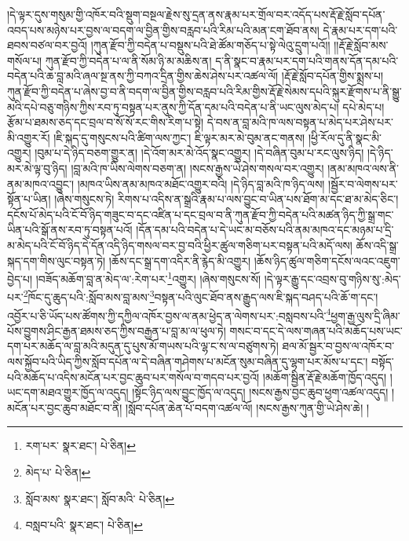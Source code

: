།དེ་ལྟར་དུས་གསུམ་གྱི་འཁོར་བའི་སྡུག་བསྔལ་རྗེས་སུ་དྲན་ནས་རྣམ་པར་གྲོལ་བར་འདོད་པས་རྡོ་རྗེ་སློབ་དཔོན་འབད་པས་མཉེས་པར་བྱས་ལ་བདག་ལ་བྱིན་གྱིས་བརླབ་པའི་རིམ་པའི་མན་ངག་ཐོབ་ནས། དེ་རྣམ་པར་དག་པའི་ཐབས་བཙལ་བར་བྱའོ། །ཀུན་རྫོབ་ཀྱི་བདེན་པ་བསྡུས་པའི་ཐེ་ཚོམ་གཅོད་པ་སྟེ་ལེའུ་དྲུག་པའོ།། །།རྡོ་རྗེ་སློབ་མས་གསོལ་པ། ཀུན་རྫོབ་ཀྱི་བདེན་པ་ལ་ནི་སོམ་ཉི་མ་མཆིས་ན། ད་ནི་སྣང་བ་རྣམ་པར་དག་པའི་གནས་དོན་དམ་པའི་བདེན་པའི་ཆ་བླ་མའི་ཞལ་སྔ་ནས་ཀྱི་བཀའ་དྲིན་གྱིས་ཆེས་ཤེས་པར་འཚལ་ལོ། །རྡོ་རྗེ་སློབ་དཔོན་གྱིས་སྨྲས་པ། ཀུན་རྫོབ་ཀྱི་བདེན་པ་ཞེས་བྱ་བ་ནི་བདག་ལ་བྱིན་གྱིས་བརླབ་པའི་རིམ་གྱིས་རྡོ་རྗེ་སེམས་དཔའི་སྐུར་རྫོགས་པ་ནི་སྒྱུ་མའི་དཔེ་བཅུ་གཉིས་ཀྱིས་རབ་ཏུ་བསྟན་པར་ནུས་ཀྱི་དོན་དམ་པའི་བདེན་པ་ནི་ཡང་ལུས་མེད་པ། དཔེ་མེད་པ། རྩོམ་པ་ཐམས་ཅད་དང་བྲལ་བ་སོ་སོ་རང་གིས་རིག་པ་སྟེ། དེ་བས་ན་བླ་མའི་ཁ་ལས་བསྟན་པ་མེད་པར་ཤེས་པར་མི་འགྱུར་རོ། །ཇི་སྐད་དུ་གསུངས་པའི་ཚིག་ལས་ཀྱང་། ཇི་ལྟར་མར་མེ་བུམ་ནང་གནས། །ཕྱི་རོལ་དུ་ནི་སྣང་མི་འགྱུར། །བུམ་པ་དེ་ཉིད་བཅག་གྱུར་ན། །དེ་འོག་མར་མེ་འོད་སྣང་འགྱུར། །དེ་བཞིན་བུམ་པ་རང་ལུས་ཉིད། །དེ་ཉིད་མར་མེ་ལྟ་བུ་ཉིད། །བླ་མའི་ཁ་ཡིས་ལེགས་བཅག་ན། །སངས་རྒྱས་ཡེ་ཤེས་གསལ་བར་འགྱུར། །ནམ་མཁའ་ལས་ནི་ནམ་མཁའ་འབྱུང་། །མཁའ་ཡིས་ནམ་མཁའ་མཐོང་འགྱུར་བའི། །དེ་ཉིད་བླ་མའི་ཁ་ཉིད་ལས། །སྦྱོར་བ་ལེགས་པར་སྟོན་པ་ཡིན། །ཞེས་གསུངས་ཏེ། རིགས་པ་འདིས་ན་སྒྲའི་རྣམ་པ་ལས་བྱུང་བ་ཡིན་པས་ཐོག་མ་དང་ཐ་མ་མེད་ཅིང་། དངོས་པོ་མེད་པའི་ངོ་བོ་ཉིད་གཟུང་བ་དང་འཛིན་པ་དང་བྲལ་བ་ནི་ཀུན་རྫོབ་ཀྱི་བདེན་པའི་མཚན་ཉིད་ཀྱི་སྒྲ་གང་ཡིན་པའི་སྒོ་ནས་རབ་ཏུ་བསྟན་པའོ། །དོན་དམ་པའི་བདེན་པ་དེ་ཡང་མ་བཅོས་པའི་ནམ་མཁའ་དང་མཉམ་པ་དྲི་མ་མེད་པའི་ངོ་བོ་ཉིད་དེ་དོན་འདི་ཉིད་གསལ་བར་བྱ་བའི་ཕྱིར་ཚུལ་གཅིག་པར་བསྟན་པའི་མདོ་ལས། ཆོས་འདི་སྒྲ་སྐད་དག་གིས་ལུང་བསྟན་ཏེ། །ཆོས་དང་སྒྲ་དག་འདིར་ནི་རྙེད་མི་འགྱུར། །ཆོས་ཉིད་ཚུལ་གཅིག་དངོས་ལའང་འཇུག་བྱེད་པ། །བཟོད་མཆོག་བླ་ན་མེད་ལ་:རེག་པར་\footnote{རག་པར་  སྣར་ཐང་།  པེ་ཅིན། }འགྱུར། །ཞེས་གསུངས་སོ། །དེ་ལྟར་རྒྱུ་དང་འབྲས་བུ་གཉིས་སུ་:མེད་པར་\footnote{མེད་པ་  པེ་ཅིན། }ཁོང་དུ་ཆུད་པའི་:སློབ་མས་བླ་མས་\footnote{སློབ་མས་  སྣར་ཐང་། སློབ་མའི་  པེ་ཅིན། }བསྟན་པའི་ལུང་ཐོབ་ནས་རྒྱུད་ལས་ཇི་སྐད་བཤད་པའི་ཆོ་ག་དང་། འབྱོར་པ་ཅི་ཡོད་པས་ཚོགས་ཀྱི་དཀྱིལ་འཁོར་བྱས་ལ་ནམ་ཕྱེད་ན་ལེགས་པར་:བསླབས་པའི་\footnote{བསླབ་པའི་  སྣར་ཐང་།  པེ་ཅིན། }ཕྱག་རྒྱ་ལུས་དྲི་ཞིམ་པོས་བྱུགས་ཤིང་རྒྱན་ཐམས་ཅད་ཀྱིས་བརྒྱན་པ་བླ་མ་ལ་ཕུལ་ཏེ། གསང་བ་དང་དེ་ལས་གཞན་པའི་མཆོད་པས་ཡང་དག་པར་མཆོད་ལ་བླ་མའི་མདུན་དུ་པུས་མོ་གཡས་པའི་ལྷ་ང་ས་ལ་བཙུགས་ཏེ། ཐལ་མོ་སྦྱར་བ་བྱས་ལ་འཁོར་བ་ལས་སྐྱོབ་པའི་ཡིད་ཀྱིས་སློབ་དཔོན་ལ་དེ་བཞིན་གཤེགས་པ་མངོན་སུམ་བཞིན་དུ་ལྷག་པར་མོས་པ་དང་། བསྟོད་པའི་མཆོད་པ་འདིས་མངོན་པར་བྱང་ཆུབ་པར་གསོལ་བ་གདབ་པར་བྱའོ། །མཆོག་སྦྱིན་རྡོ་རྗེ་མཆོག་ཁྱོད་འདུད། །ཡང་དག་མཐའ་གྱུར་ཁྱོད་ལ་འདུད། །སྟོང་ཉིད་ལས་བྱུང་ཁྱོད་ལ་འདུད། །སངས་རྒྱས་བྱང་ཆུབ་ཕྱག་འཚལ་འདུད། །མངོན་པར་བྱང་ཆུབ་མཐོང་བ་ནི། །སློབ་དཔོན་ཆེན་པོ་བདག་འཚལ་ལོ། །སངས་རྒྱས་ཀུན་གྱི་ཡེ་ཤེས་ཆེ། །
